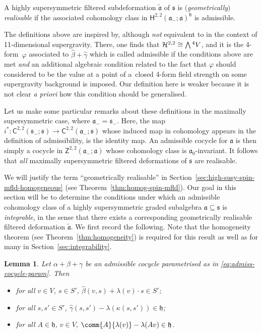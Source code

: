 \documentclass[10pt,a4paper]{amsart}
\numberwithin{equation}{section}
\newtheorem{Lemma}[Theorem]{Lemma}
\newcommand{\fa}{\mathfrak{a}}
\newcommand{\fh}{\mathfrak{h}}
\newcommand{\fs}{\mathfrak{s}}
\newcommand{\cH}{\mathcal{H}}
\newcommand{\ssC}{\mathsf{C}}
\newcommand{\ssH}{\mathsf{H}}
\newcommand{\ssZ}{\mathsf{Z}}
\newcommand{\betahat}{\widehat{\beta}}
\newcommand{\gammahat}{\widehat{\gamma}}
\newcommand{\fatilde}{\widetilde{\fa}}
\newcommand{\Wedge}{\mathchoice{{\textstyle\bigwedge}}{\bigwedge}{\bigwedge}{\bigwedge}}	%
\newcommand{\1}{\mathbbm{1}}
\begin{document}
\begin{Definition}\label{def:geom-real}
	A highly supersymmetric filtered subdeformation $\fatilde$ of $\fs$ is \emph{$($geometrically$)$ realisable} if the associated cohomology class in $\ssH^{2,2}(\fa_-;\fa)^\fh$ is admissible.
\end{Definition}

The definitions above are inspired by, although \emph{not} equivalent to \cite[Definition~9]{Figueroa-OFarrill2017_1} in the context of 11-dimensional supergravity. There, one finds that $\cH^{2,2}\cong \Wedge^4V$, and it is the 4-form~$\varphi$ associated to $\betahat+\gammahat$ which is called admissible if the conditions above are met \emph{and} an additional algebraic condition related to the fact that $\varphi$ should considered to be the value at a point of a~closed 4-form field strength on some supergravity background is imposed. Our definition here is weaker because it is not clear \textit{a priori} how this condition should be generalised.

Let us make some particular remarks about these definitions in the maximally supersymmetric case, where $\fa_-=\fs_-$. Here, the map $i^*\colon\ssC^{2,2}(\fs_-;\fs)\to\ssC^{2,2}(\fa_-;\fs)$ whose induced map in cohomology appears in the definition of admissibility, is the identity map. An admissible cocycle for $\fa$ is then simply a cocycle in $\ssZ^{2,2}(\fa_-;\fa)$ whose cohomology class is $\fa_0$-invariant. It follows that \emph{all} maximally supersymmetric filtered deformations of $\fs$ are realisable.

We will justify the term ``geometrically realisable'' in Section~\ref{sec:high-susy-spin-mfld-homogeneous} (see Theorem~\ref{thm:homog-spin-mfld}). Our goal in this section will be to determine the conditions under which an admissible cohomology class of a highly supersymmetric graded subalgebra $\fa\subseteq\fs$ is \emph{integrable}, in the sense that there exists a corresponding geometrically realisable filtered deformation $\fatilde$. We first record the following. Note that the homogeneity theorem (see Theorem~\ref{thm:homogeneity}) is required for this result as well as for many in Section~\ref{sec:integrability}.

\begin{Lemma}\label{lemma:admiss-props}
	Let $\alpha+\beta+\gamma$ be an admissible cocycle parametrised as in \eqref{eq:admiss-cocycle-param}. Then
	\begin{itemize}\itemsep=0pt
		\item for all $v\in V$, $s\in S'$, $\betahat(v,s)+\lambda(v)\cdot s \in S'$;
		\item for all $s,s'\in S'$, $\gammahat(s,s')-\lambda(\kappa(s,s'))\in\fh$;
		\item for all $A\in\fh$, $v\in V$, $\comm{A}{\lambda(v)}-\lambda(Av)\in\fh$.
	\end{itemize}
\end{Lemma}
\end{document}
